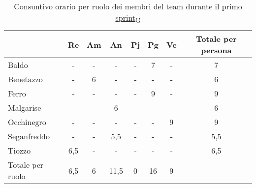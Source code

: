 \begin{table}[!h]
	\centering
	\begin{tabular}{ | l | c | c | c | c | c | c | c | }
		\hline
		\textbf{}        & \textbf{Re} & \textbf{Am} & \textbf{An} & \textbf{Pj} & \textbf{Pg} & \textbf{Ve} & \textbf{Totale per persona} \\
		\hline
		Baldo            & -           & -           & -           & -           & 7           & -           & 7                           \\
		Benetazzo        & -           & 6           & -           & -           & -           & -           & 6                           \\
		Ferro            & -           & -           & -           & -           & 9           & -           & 9                           \\
		Malgarise        & -           & -           & 6           & -           & -           & -           & 6                           \\
		Occhinegro       & -           & -           & -           & -           & -           & 9           & 9                           \\
		Seganfreddo      & -           & -           & 5,5         & -           & -           & -           & 5,5                         \\
		Tiozzo           & 6,5         & -           & -           & -           & -           & -           & 6,5                         \\
		\hline
		Totale per ruolo & 6,5         & 6           & 11,5        & 0           & 16          & 9           & -                           \\
		\hline
	\end{tabular}
	\caption{Consuntivo orario per ruolo dei membri del team durante il primo \href{https://7last.github.io/docs/rtb/documentazione-interna/glossario\#sprint}{sprint\textsubscript{G}}}
	
\end{table}

